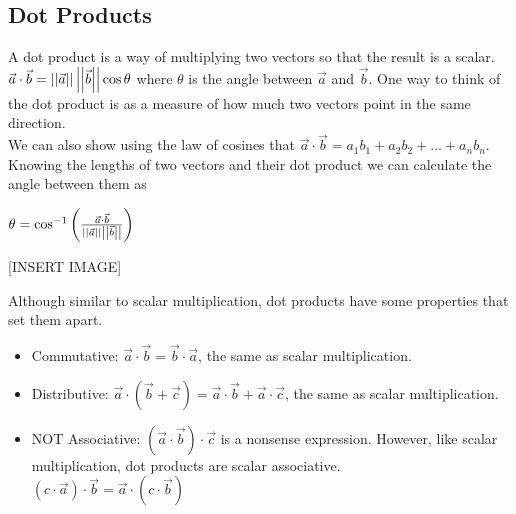 \subsection{Dot Products}
\noindent
A dot product is a way of multiplying two vectors so that the result is a scalar. $\vec{a}\cdot\vec{b}=\left|\left|\vec{a}\right|\right|\left|\left|\vec{b}\right|\right|\cos{\theta}$ where $\theta$ is the angle between $\vec{a}$ and $\vec{b}$. One way to think of the dot product is as a measure of how much two vectors point in the same direction.\\
We can also show using the law of cosines that $\vec{a}\cdot\vec{b}=a_1b_1+a_2b_2+...+a_nb_n$.\\
Knowing the lengths of two vectors and their dot product we can calculate the angle between them as\\
\begin{center}
	$\theta=\cos^{-1}{\left(\frac{\vec{a}\cdot\vec{b}}{\left|\left|\vec{a}\right|\right|\left|\left|\vec{b}\right|\right|}\right)}$
\end{center}

[INSERT IMAGE]

\noindent
Although similar to scalar multiplication, dot products have some properties that set them apart.
\begin{itemize}
	\item Commutative: $\vec{a}\cdot\vec{b}=\vec{b}\cdot\vec{a}$, the same as scalar multiplication.
	\item Distributive: $\vec{a}\cdot\left(\vec{b}+\vec{c}\right)=\vec{a}\cdot\vec{b}+\vec{a}\cdot\vec{c}$, the same as scalar multiplication.
	\item NOT Associative: $\left(\vec{a}\cdot\vec{b}\right)\cdot\vec{c}$ is a nonsense expression. However, like scalar multiplication, dot products are scalar associative.\\ 
	$\left(c\cdot\vec{a}\right)\cdot\vec{b}=\vec{a}\cdot\left(c\cdot\vec{b}\right)$
\end{itemize}